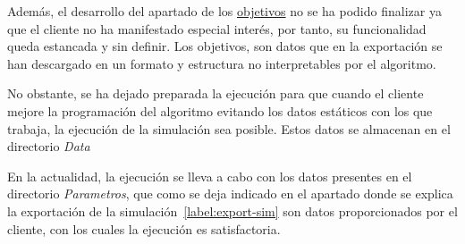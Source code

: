 Además, el desarrollo del apartado de los \href{https://www.proyectoubu.nesiweb.com/objectives/home}{objetivos} no se ha podido finalizar ya que el cliente no ha manifestado especial interés, por tanto, su funcionalidad queda estancada y sin definir. Los objetivos, son datos que en la exportación se han descargado en un formato y estructura no interpretables por el algoritmo.

No obstante, se ha dejado preparada la ejecución para que cuando el cliente mejore la programación del algoritmo evitando los datos estáticos con los que trabaja, la ejecución de la simulación sea posible. Estos datos se almacenan en el directorio \textit{Data}

En la actualidad, la ejecución se lleva a cabo con los datos presentes en el directorio \textit{Parametros}, que como se deja indicado en el apartado donde se explica la exportación de la simulación~\ref{label:export-sim} son datos proporcionados por el cliente, con los cuales la ejecución es satisfactoria.



 